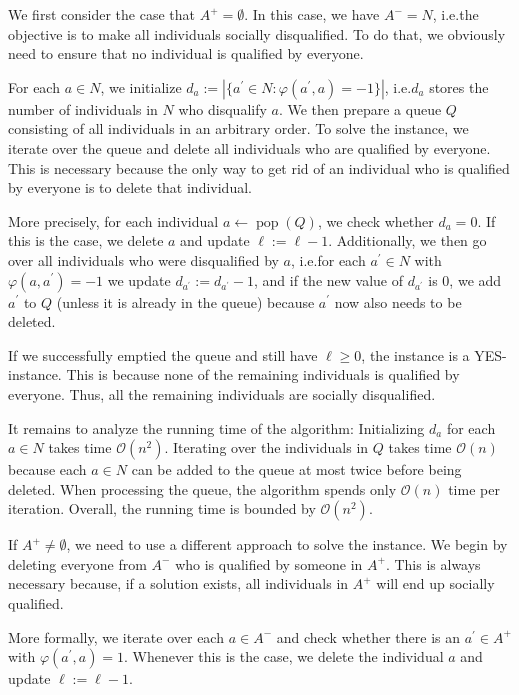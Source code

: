 \documentclass[
    12pt,               %
    a4paper,            %
    bibtotoc,           %
    pointlessnumbers,   %
    ngerman,            %
    titlepage,          %
    leqno,              %
    ]{scrarticle}       %
\begin{document}
\begin{Proof}
We first consider the case that $A^+ = \emptyset$. In this case, we have $A^- = N$, i.e.\@ the objective is to make all individuals socially disqualified. To do that, we obviously need to ensure that no individual is qualified by everyone.

For each $a \in N$, we initialize $d_a := |\{ a^\prime \in N : \varphi(a^\prime, a) = -1 \}|$, i.e.\@ $d_a$ stores the number of individuals in $N$ who disqualify $a$. We then prepare a queue $Q$ consisting of all individuals in an arbitrary order. To solve the instance, we iterate over the queue and delete all individuals who are qualified by everyone. This is necessary because the only way to get rid of an individual who is qualified by everyone is to delete that individual.

More precisely, for each individual $a \leftarrow \operatorname{pop}(Q)$, we check whether $d_a = 0$. If this is the case, we delete $a$ and update $\ell := \ell - 1$. Additionally, we then go over all individuals who were disqualified by $a$, i.e.\@ for each $a^\prime \in N$ with $\varphi(a, a^\prime) = -1$ we update $d_{a^\prime} := d_{a^\prime} - 1$, and if the new value of $d_{a^\prime}$ is $0$, we add $a^\prime$ to $Q$ (unless it is already in the queue) because $a^\prime$ now also needs to be deleted.

If we successfully emptied the queue and still have $\ell \geq 0$, the instance is a YES-instance. This is because none of the remaining individuals is qualified by everyone. Thus, all the remaining individuals are socially disqualified.

It remains to analyze the running time of the algorithm: Initializing $d_a$ for each $a \in N$ takes time $\mathcal{O}(n^2)$. Iterating over the individuals in $Q$ takes time $\mathcal{O}(n)$ because each $a \in N$ can be added to the queue at most twice before being deleted. When processing the queue, the algorithm spends only $\mathcal{O}(n)$ time per iteration. Overall, the running time is bounded by $\mathcal{O}(n^2)$.

\vspace{1em}

If $A^+ \neq \emptyset$, we need to use a different approach to solve the instance. We begin by deleting everyone from $A^-$ who is qualified by someone in $A^+$. This is always necessary because, if a solution exists, all individuals in $A^+$ will end up socially qualified.

More formally, we iterate over each $a \in A^-$ and check whether there is an $a^\prime \in A^+$ with $\varphi(a^\prime, a) = 1$. Whenever this is the case, we delete the individual $a$ and update $\ell := \ell - 1$.


\end{Proof}
\end{document}
